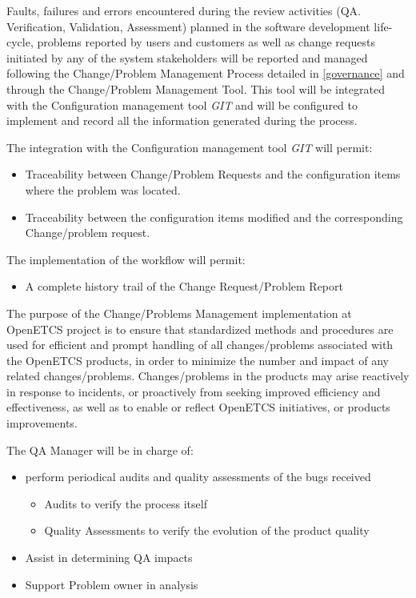 \documentclass{template/openetcs_article}
\begin{document}
Faults, failures and errors encountered during the review activities (QA. Verification, Validation, Assessment) planned in the software development life-cycle, problems reported by users and customers as well as change requests initiated by any of the system stakeholders will be reported and managed following the Change/Problem Management Process  \citep{emp} detailed in \href{https://github.com/openETCS/governance/tree/master/Change-Problem%20Process}{[governance]} and through the Change/Problem Management Tool. This tool will be integrated with the Configuration management tool {\it GIT} and will be configured to implement and record all the information generated during the process.

The integration with the Configuration management tool {\it GIT} will permit:
\begin{itemize}
\item Traceability between Change/Problem Requests and the configuration items where the problem was located.
\item Traceability between the configuration items modified and the corresponding Change/problem request. 
\end{itemize}
 
The implementation of the workflow will permit:
\begin{itemize}
\item A complete history trail of the Change Request/Problem Report
\end{itemize}

The purpose of the Change/Problems Management implementation at OpenETCS project is to ensure that standardized methods and procedures are used for efficient and prompt handling of all changes/problems associated with the OpenETCS products, in order to minimize the number and impact of any related changes/problems. Changes/problems in the products may arise reactively in response to incidents, or proactively from seeking improved efficiency and effectiveness, as well as to enable or reflect OpenETCS initiatives, or products improvements.

The QA Manager will be in charge of:
\begin{itemize}
\item perform periodical audits and quality assessments of the bugs received
\begin{itemize}
\item Audits to verify the process itself
\item Quality Assessments to verify the evolution of the product quality
\end{itemize}
\item Assist in determining QA impacts
\item Support Problem owner in analysis
\end{itemize}
\end{document}
